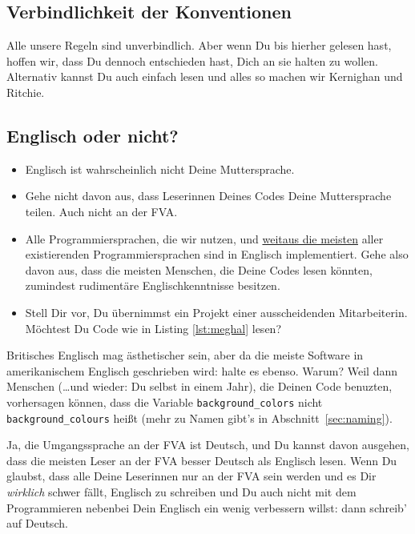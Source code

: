 \documentclass[twoside]{scrartcl}
\providecommand{\code}[1]{\texttt{#1}}
\begin{document}
\subsection{Verbindlichkeit der Konventionen\label{sec:zwang}}
Alle unsere Regeln sind unverbindlich. Aber wenn Du bis hierher gelesen hast,
hoffen wir, dass Du dennoch entschieden hast, Dich an sie halten zu wollen.
Alternativ kannst Du auch einfach \cite{KR} lesen und alles so machen wir 
Kernighan und Ritchie.

\subsection{Englisch oder nicht?}
\begin{itemize}
\item Englisch ist wahrscheinlich nicht Deine Muttersprache.
\end{itemize}
\begin{itemize}
\item Gehe nicht davon aus, dass Leserinnen Deines Codes Deine
  Muttersprache teilen. Auch nicht an der FVA.
\item Alle Programmiersprachen, die wir nutzen, und
  \href{http://en.wikipedia.org/wiki/Non-English-based_programming_languages}
  {weitaus die meisten}
  aller existierenden Programmiersprachen sind in Englisch implementiert.
  Gehe also davon aus, dass die meisten Menschen, die Deine Codes lesen
  k\"o{}nnten, zumindest rudiment\"a{}re Englischkenntnisse besitzen.
\item Stell Dir vor, Du \"u{}bernimmst ein Projekt einer ausscheidenden
  Mitarbeiterin. M\"o{}chtest Du Code wie in Listing \ref{lst:meghal}
  lesen?
\end{itemize}


 Britisches Englisch mag \"a{}sthetischer sein,
aber da die meiste Software in amerikanischem Englisch geschrieben wird: halte
es ebenso. Warum? Weil dann Menschen (\ldots und wieder: Du selbst in einem
Jahr), die Deinen Code benuzten, vorhersagen k\"o{}nnen, dass die Variable
\code{background\_colors} nicht \code{background\_colours} hei\ss{}t (mehr zu
Namen gibt's in Abschnitt~\ref{sec:naming}). 

 Ja, die Umgangssprache an der FVA ist Deutsch, und Du
kannst davon ausgehen, dass die meisten Leser an der FVA besser Deutsch als
Englisch lesen. Wenn Du glaubst, dass alle Deine Leserinnen nur an der FVA
sein werden und es Dir \emph{wirklich} schwer f\"a{}llt, Englisch zu schreiben
und Du auch nicht mit dem Programmieren nebenbei Dein Englisch ein wenig
verbessern willst: dann schreib' auf Deutsch.
\end{document}
